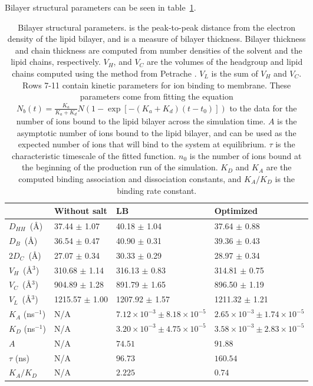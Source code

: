 Bilayer structural parameters can be seen in table~\ref{tabch2:struc}.
\begin{table}[H]
    \caption[Bilayer structural parameters]{Bilayer structural parameters. \dhh{} is the peak-to-peak distance from the electron density of the
        lipid bilayer, and is a measure of bilayer thickness. Bilayer thickness \db~and chain thickness \dc{} are computed from
        number densities of the solvent and the lipid chains, respectively. $V_H$, and $V_C$ are the volumes of the headgroup and lipid chains computed
        using the method from Petrache \etal{}\cite{petrache:1997}. $V_L$ is the sum of $V_H$ and $V_C$. 
        Rows 7-11 contain kinetic parameters for ion binding to membrane. These parameters come from fitting 
        the equation $ N_b(t)= \frac{K_{a}}{K_{a}+K_{d}} 
            N\left(1-\exp\left[-\left(K_{a}+K_{d}\right)\left(t-t_0\right)\right]\right)$ to the data for the number of ions
            bound to the lipid bilayer across the simulation time. 
            $A$ is the asymptotic number of ions bound to the lipid bilayer, and can be used as the expected number of ions
        that will bind to the system at equilibrium. $\tau$ is the characteristic timescale of the fitted function. $n_0$ is the number of ions bound at the beginning
        of the production run of the simulation. $K_D$ and $K_A$ are the computed binding association and dissociation constants, and $K_A/K_D$ is the binding
    rate constant.}
    \label{tabch2:struc}
    {\footnotesize
    \begin{tabularx}{\textwidth}{X|X|X|X}
         &Without salt      &LB                 &Optimized\\\hline
        $D_{HH}$~(\AA)&37.44 $\pm$ 1.07  &40.18 $\pm$ 1.04   &37.64 $\pm$ 0.88 \\
        $D_B$~(\AA)   &36.54 $\pm$ 0.47  &40.90 $\pm$ 0.31   &39.36 $\pm$ 0.43\\
        $2D_C$~(\AA)  &27.07 $\pm$ 0.34  &30.33 $\pm$ 0.29   &28.97 $\pm$ 0.34     \\
        $V_H$~(\AA$^3$) &310.68 $\pm$ 1.14 &316.13 $\pm$ 0.83  &314.81 $\pm$ 0.75          \\
        $V_C$~(\AA$^3$) &904.89 $\pm$ 1.28 &891.79 $\pm$ 1.65  &896.50 $\pm$ 1.19         \\
        $V_L$~(\AA$^3$) &1215.57 $\pm$ 1.00&1207.92 $\pm$ 1.57 &1211.32 $\pm$ 1.21    \\
        $K_{A}$ (ns$^{-1}$)        &N/A & $7.12\times10^{-3}\pm8.18\times10^{-5}$     &$2.65\times10^{-3}\pm1.74\times10^{-5}$ \\
        $K_{D}$ (ns$^{-1}$)        &N/A & $3.20\times10^{-3}\pm4.75\times10^{-5}$     &$3.58\times10^{-3}\pm2.83\times10^{-5}$ \\
        $A$                        &N/A & $74.51$                        &$91.88$ \\
        $\tau$      (ns)           &N/A & $96.73$                      &$160.54$ \\
        $K_{A}/K_{D}$              &N/A & $2.225$                           &$0.74$ \\
              \end{tabularx}
          }
\end{table}

